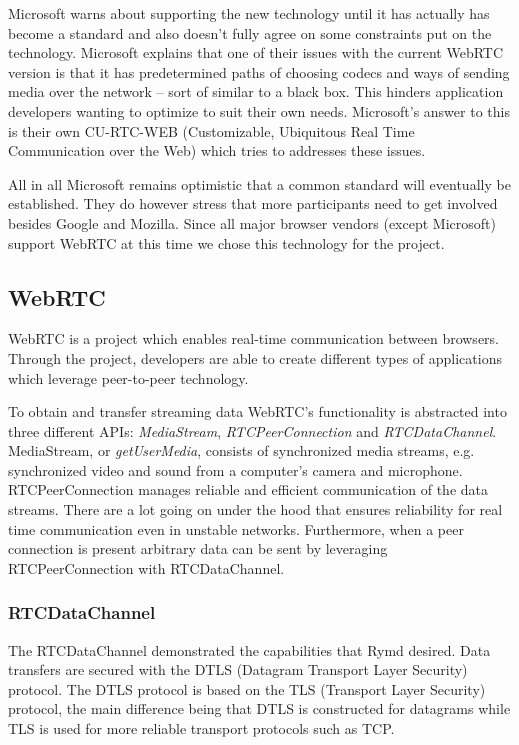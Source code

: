 Microsoft warns about supporting the new technology until it has actually has become a standard and also doesn’t fully agree on some constraints put on the technology\cite{WebRTCAndMicrosoft:2012:Online}. Microsoft explains that one of their issues with the current WebRTC version is that it has predetermined paths of choosing codecs and ways of sending media over the network – sort of similar to a black box. This hinders application developers wanting to optimize to suit their own needs. Microsoft’s answer to this is their own CU-RTC-WEB (Customizable, Ubiquitous Real Time Communication over the Web) which tries to addresses these issues.

All in all Microsoft remains optimistic that a common standard will eventually be established\cite{WebRTCAndMicrosoft:2012:Online}. They do however stress that more participants need to get involved besides Google and Mozilla. Since all major browser vendors (except Microsoft) support WebRTC at this time we chose this technology for the project.


\subsection{WebRTC}
WebRTC is a project which enables real-time communication between browsers\cite{WebRTC:Online}. Through the project, developers are able to create different types of applications which leverage peer-to-peer technology.

To obtain and transfer streaming data WebRTC's functionality is abstracted into three different APIs: \emph{MediaStream}, \emph{RTCPeerConnection} and \emph{RTCDataChannel}\cite{WebRTCBasics:2012:Online}. MediaStream, or \emph{getUserMedia}, consists of synchronized media streams, e.g. synchronized video and sound from a computer's camera and microphone. RTCPeerConnection manages reliable and efficient communication of the data streams. There are a lot going on under the hood that ensures reliability for real time communication even in unstable networks. Furthermore, when a peer connection is present arbitrary data can be sent by leveraging RTCPeerConnection with RTCDataChannel.

\subsubsection{RTCDataChannel}
The RTCDataChannel demonstrated the capabilities that Rymd desired. Data transfers are secured with the DTLS (Datagram Transport Layer Security) protocol. The DTLS protocol is based on the TLS (Transport Layer Security) protocol, the main difference being that DTLS is constructed for datagrams while TLS is used for more reliable transport protocols such as TCP.


